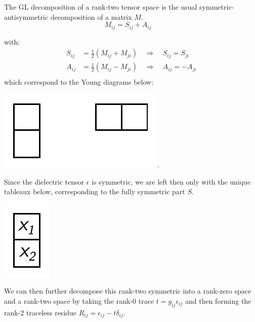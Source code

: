 \documentclass[10pt,a4paper]{article}
\begin{document}
The GL decomposition of a rank-two tensor space is the usual symmetric-antisymmetric decomposition of a matrix $M$.
$$
M_{ij} = S_{ij} + A_{ij}\quad
$$
\begin{center}
with:
\begin{align*}
S_{ij}&=\frac{1}{2}(M_{ij}+M_{ji})\quad \Rightarrow\quad S_{ij}=S_{ji}\\
A_{ij}&=\frac{1}{2}(M_{ij}-M_{ji})\quad \Rightarrow\quad A_{ij}=-A_{ji}\\
\end{align*}
which correspond to the Young diagrams below:

\includegraphics[scale=0.7]{rank2_young.pdf}.
\end{center}
Since the dielectric tensor $\epsilon$ is symmetric, we are left then only with the unique tableaux below, corresponding to the fully symmetric part $S$.
\begin{center}
\includegraphics[scale=0.7]{dielectric_young.pdf}
\end{center}
We can then further decompose this rank-two symmetric into a rank-zero space and a rank-two space by taking the rank-0 trace $t = g_{ij}\epsilon_{ij}$ and then forming the rank-2 traceless residue $R_{ij}=\epsilon_{ij}-t\delta_{ij}$.
\end{document}
